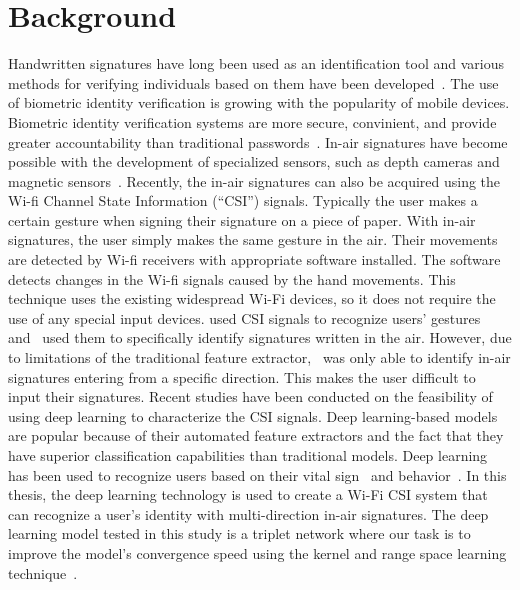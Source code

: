 \section{Background}
Handwritten signatures have long been used as an identification tool and various methods for verifying individuals based on them have been developed~\cite{fahmy2010online,galbally2015line,sanmorino2012survey,sesa2012information}.
The use of biometric identity verification is growing with the popularity of mobile devices. Biometric identity verification systems are more secure, convinient, and provide greater accountability than traditional passwords~\cite{hutton2004biometrics,jain2006biometrics,ross2006handbook}.
In-air signatures have become possible with the development of specialized sensors, such as depth cameras and magnetic sensors~\cite{bailador2011analysis, jeon2012system,ketabdar2012magnetic,malik20183dairsig}.
Recently, the in-air signatures can also be acquired using the Wi-fi Channel State Information (``CSI'') signals. Typically the user makes a certain gesture when signing their signature on a piece of paper. With in-air signatures, the user simply makes the same gesture in the air. Their movements are detected by Wi-fi receivers with appropriate software installed. The software detects changes in the Wi-fi signals caused by the hand movements. This technique uses the existing widespread Wi-Fi devices, so it does not require the use of any special input devices. 
\cite{abdelnasser2015wigest,nandakumar2014wi} used CSI signals to recognize users' gestures and~\cite{moon2017air} used them to specifically identify signatures written in the air. 
However, due to limitations of the traditional feature extractor,~\cite{moon2017air} was only able to identify in-air signatures entering from a specific direction. This makes the user difficult to input their signatures.
Recent studies have been conducted on the feasibility of using deep learning to characterize the CSI signals. Deep learning-based models are popular because of their automated feature extractors and the fact that they have superior classification capabilities than traditional models. Deep learning has been used to recognize users based on their vital sign~\cite{zhang2017pulseprint,szankin2018long} and behavior~\cite{shi2017smart,pokkunuru2018neuralwave}.
In this thesis, the deep learning technology is used to create a Wi-Fi CSI system that can recognize a user's identity with multi-direction in-air signatures.
The deep learning model tested in this study is a triplet network where our task is to improve the model's convergence speed using the kernel and range space learning technique~\cite{toh2018gradient}.

